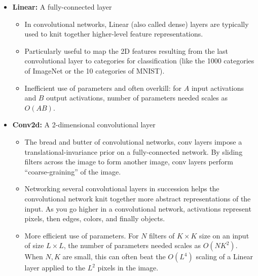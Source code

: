  \begin{itemize}
    \item \textbf{Linear:} A fully-connected layer
    \begin{itemize}
        \item In convolutional networks, Linear (also called dense) layers are typically used to knit together higher-level feature representations.
        \item Particularly useful to map the 2D features resulting from the last convolutional layer to categories for classification (like the 1000 categories of ImageNet or the 10 categories of MNIST).
        \item Inefficient use of parameters and often overkill: for $A$ input activations and $B$ output activations, number of parameters needed scales as $O(AB)$.
    \end{itemize}
    \item \textbf{Conv2d:} A 2-dimensional convolutional layer
    \begin{itemize}
        \item The bread and butter of convolutional networks, conv layers impose a translational-invariance prior on a fully-connected network. By sliding filters across the image to form another image, conv layers perform ``coarse-graining'' of the image.
        \item Networking several convolutional layers in succession helps the convolutional network knit together more abstract representations of the input. As you go higher in a convolutional network, activations represent pixels, then edges, colors, and finally objects.
        \item More efficient use of parameters. For $N$ filters of $K \times K$ size on an input of size $L \times L$, the number of parameters needed scales as $O(N K^2)$. When $N, K$ are small, this can often beat the $O(L^4)$ scaling of a Linear layer applied to the $L^2$ pixels in the image.


\end{itemize}
\end{itemize}

